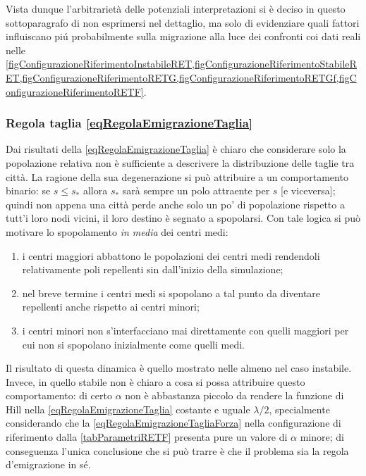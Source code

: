       Vista dunque l'arbitrarietà delle potenziali interpretazioni si è deciso in questo sottoparagrafo di non esprimersi nel dettaglio, ma solo di evidenziare quali fattori influiscano piú probabilmente sulla migrazione alla luce dei confronti coi dati reali nelle \cref{figConfigurazioneRiferimentoInstabileRET,figConfigurazioneRiferimentoStabileRET,figConfigurazioneRiferimentoRETG,figConfigurazioneRiferimentoRETGf,figConfigurazioneRiferimentoRETF}.

      \subsubsection{Regola taglia \ref{eqRegolaEmigrazioneTaglia}}

        Dai risultati della \ref{eqRegolaEmigrazioneTaglia} è chiaro che considerare solo la popolazione relativa non è sufficiente a descrivere la distribuzione delle taglie tra città. La ragione della sua degenerazione si può attribuire a un comportamento binario: se \(s≤s_*\) allora \(s_*\) sarà sempre un polo attraente per \(s\) [e viceversa]; quindi non appena una città perde anche solo un po' di popolazione rispetto a tutt'i loro nodi vicini, il loro destino è segnato a spopolarsi. Con tale logica si può motivare lo spopolamento \textit{in media} dei centri medi:

        \begin{enumerate}[
          label=\arabic*.,
        ]
          \item i centri maggiori abbattono le popolazioni dei centri medi rendendoli relativamente poli repellenti sin dall'inizio della simulazione;
          \item nel breve termine i centri medi si spopolano a tal punto da diventare repellenti anche rispetto ai centri minori;
          \item i centri minori non s'interfacciano mai direttamente con quelli maggiori per cui non si spopolano inizialmente come quelli medi.
        \end{enumerate}
      
        Il risultato di questa dinamica è quello mostrato nelle  almeno nel caso instabile. Invece, in quello stabile non è chiaro a cosa si possa attribuire questo comportamento: di certo \(\alpha\) non è abbastanza piccolo da rendere la funzione di Hill nella \ref{eqRegolaEmigrazioneTaglia} costante e uguale \(\lambda/2\), specialmente considerando che la \ref{eqRegolaEmigrazioneTagliaForza} nella configurazione di riferimento dalla \cref{tabParametriRETF} presenta pure un valore di \(\alpha\) minore; di conseguenza l'unica conclusione che si può trarre è che il problema sia la regola d'emigrazione in sé.

